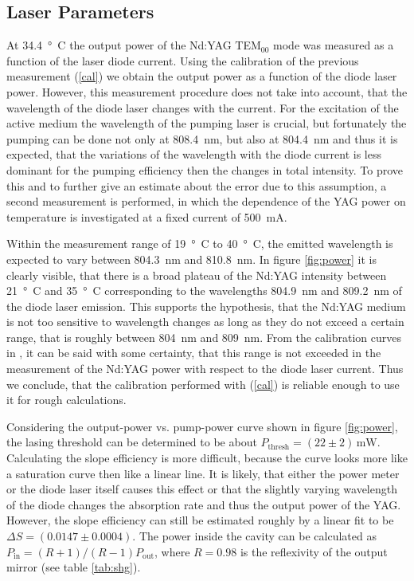 \documentclass[a4paper]{scrartcl}
\numberwithin{equation}{section}
\numberwithin{figure}{section}
\numberwithin{table}{section}
\newcommand{\Formel}[1]{(\ref{#1})}
\begin{document}
\subsection{Laser Parameters}
At \SI{34.4}{\degree C} the output power of the Nd:YAG  TEM$_{00}$ mode was measured as a function of the laser diode current. Using the calibration of the previous measurement \Formel{cal} we obtain the output power as a function of the diode laser power. However, this measurement procedure does not take into account, that the wavelength of the diode laser changes with the current. For the excitation of the active medium the wavelength of the pumping laser is crucial, but fortunately the pumping can be done not only at \SI{808.4}{nm}, but also at \SI{804.4}{nm} and thus it is expected, that the variations of the wavelength with the diode current is less dominant for the pumping efficiency then the changes in total intensity. To prove this and to further give an estimate about the error due to this assumption, a second measurement is performed, in which the dependence of the YAG power on temperature is investigated at a fixed current of \SI{500}{mA}. 

Within the measurement range of \SI{19}{ \degree C} to \SI{40}{\degree  C}, the emitted wavelength is expected to vary between \SI{804.3}{nm} and \SI{810.8}{nm}. In figure \ref{fig:power} it is clearly visible, that there is a broad plateau of the Nd:YAG intensity between \SI{21}{\degree C} and \SI{35}{\degree C} corresponding to the wavelengths \SI{804.9}{nm} and \SI{809.2}{nm} of the diode laser emission. This supports the hypothesis, that the Nd:YAG medium is not too sensitive to wavelength changes as long as they do not exceed a certain range, that is roughly between \SI{804}{nm} and \SI{809}{nm}. From the calibration curves in \cite{script}, it can be said with some certainty, that this range is not exceeded in the measurement of the Nd:YAG power with respect to the diode laser current. Thus we conclude, that the calibration performed with \Formel{cal} is reliable enough to use it for rough calculations.

Considering the output-power vs. pump-power curve shown in figure \ref{fig:power}, the lasing threshold can be determined to be about $P_\text{thresh}=(22\pm 2)\,\text{mW}$. Calculating the slope efficiency is more difficult, because the curve looks more like a saturation curve then like a linear line. It is likely, that either the power meter or the diode laser itself causes this effect or that the slightly varying wavelength of the diode changes the absorption rate and thus the output power of the YAG. However, the slope efficiency can still be estimated roughly by a linear fit to be $\Delta S = (0.0147\pm 0.0004)$. The power inside the cavity can be calculated as $P_\text{in}=(R+1)/(R-1) P_\text{out}$, where $R=0.98$ is the reflexivity of the output mirror (see table \ref{tab:shg}).
\end{document}

